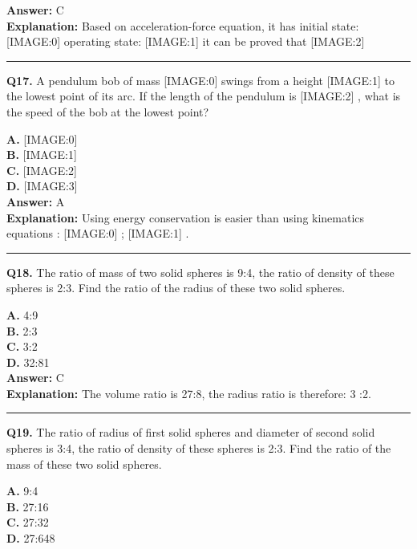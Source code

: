 \documentclass[12pt]{article}
\begin{document}
\textbf{Answer:} C \\
\textbf{Explanation:} Based on acceleration-force equation, it has
initial state:
[IMAGE:0]
operating state:
[IMAGE:1]
it can be proved that
[IMAGE:2]

\hrule
\vspace{1em}


\noindent
\textbf{Q17.} A pendulum bob of mass
[IMAGE:0]
swings from a height
[IMAGE:1]
to the lowest point of its arc. If the length of the pendulum is
[IMAGE:2]
, what is the speed of the bob at the lowest point?



\textbf{A.} [IMAGE:0] \\
\textbf{B.} [IMAGE:1] \\
\textbf{C.} [IMAGE:2] \\
\textbf{D.} [IMAGE:3] \\

\textbf{Answer:} A \\
\textbf{Explanation:} Using energy conservation is easier than using kinematics equations :
[IMAGE:0]
;
[IMAGE:1]
.

\hrule
\vspace{1em}


\noindent
\textbf{Q18.} The ratio of mass of two solid spheres is 9:4, the ratio of density of these spheres is 2:3. Find the ratio of the radius of these two solid spheres.



\textbf{A.} 4:9 \\
\textbf{B.} 2:3 \\
\textbf{C.} 3:2 \\
\textbf{D.} 32:81 \\

\textbf{Answer:} C \\
\textbf{Explanation:} The volume ratio is 27:8, the radius ratio is therefore: 3 :2.

\hrule
\vspace{1em}


\noindent
\textbf{Q19.} The ratio of radius of first solid spheres and diameter of second solid spheres is 3:4, the ratio of density of these spheres is 2:3. Find the ratio of the mass of these two solid spheres.



\textbf{A.} 9:4 \\
\textbf{B.} 27:16 \\
\textbf{C.} 27:32 \\
\textbf{D.} 27:648 \\
\end{document}
